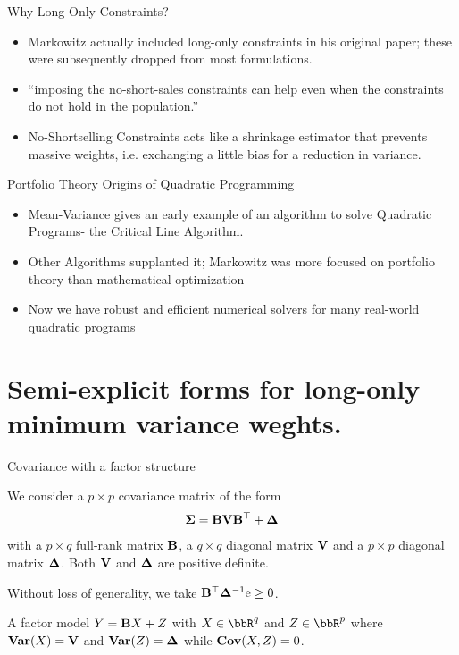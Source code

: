 \documentclass[11pt,leqno]{beamer}
\begin{document}
\begin{frame}{Why Long Only Constraints?}
\begin{itemize}
\item Markowitz actually included long-only constraints in his original paper; these were subsequently dropped from most formulations.
\item``imposing the no-short-sales constraints can help even when the constraints do not hold in the population.'' \cite{jagannathan2003}
\item No-Shortselling Constraints acts like a shrinkage estimator that prevents massive weights, i.e. exchanging a little bias for a reduction in variance.
\end{itemize}

\end{frame}

\begin{frame}{Portfolio Theory Origins of Quadratic Programming}
\begin{itemize}
\item Mean-Variance gives an early example of an algorithm to solve Quadratic Programs- the Critical Line Algorithm.
\item Other Algorithms  supplanted it; Markowitz was more focused on portfolio theory than mathematical optimization
\item Now we have robust and efficient numerical solvers for many real-world quadratic programs
\end{itemize}
\end{frame}





\section{Semi-explicit forms for long-only
minimum variance weghts.}

\begin{frame}{Covariance with a factor structure}

We consider a $p \times p$ covariance matrix of the form
\begin{align}
  \bm{\Sigma} = \mathbf{B} \mathbf{V} \mathbf{B}^\top + \bm{\Delta}
\end{align}
with a $p \times q$ full-rank matrix $\mathbf{B}$, a $q \times q$
diagonal matrix $\mathbf{V}$  and a $p \times p$ diagonal 
matrix $\bm{\Delta}$. Both $\mathbf{V}$ and $\bm{\Delta}$ are 
positive definite.

Without loss of generality, we take
$\mathbf{B}^\top \bm{\Delta}^{-1} \mathrm{e} \ge 0$.

A factor model $Y = \mathbf{B} X + Z$ with 
$X \in \bbR^q$ and $Z \in \bbR^p$ where
$\text{\bf Var}(X) = \mathbf{V}$ and $\text{\bf Var}(Z) = \bm{\Delta}$ while
$\text{\bf Cov}(X,Z) = 0$.

\end{frame}
\end{document}
